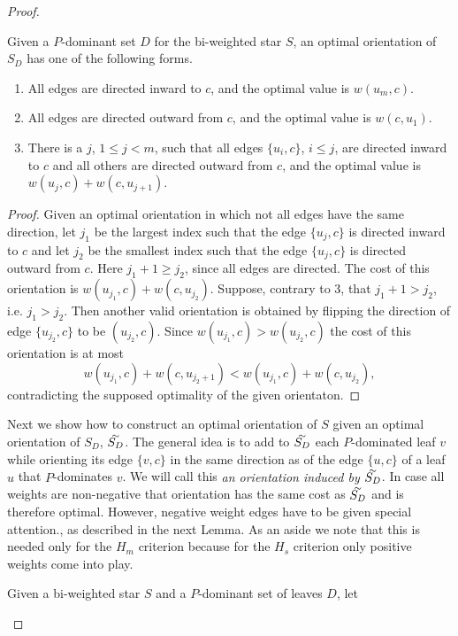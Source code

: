 \begin{proof}
\begin{lemma}\label{l.optimalS_D}
Given a $P$-dominant set $D$ for the bi-weighted star $S$, an optimal orientation of $S_D$ has one of the following forms.
\begin{enumerate}
	\item All edges are directed inward to $c$, and the optimal value is $w(u_m,c)$.
	\item All edges are directed outward from $c$, and the optimal value is $w(c,u_1)$.
	\item There is a $j$, $1\leq j<m$, such that all edges $\{u_i,c\}$, $i\leq j$, are directed inward to $c$ and all others are directed outward from $c$,
    and the optimal value is $w(u_j,c)+w(c,u_{j+1})$.
\end{enumerate}
\end{lemma}
\begin{proof}
	Given an optimal orientation in which not all edges have the same direction, 
	let $j_1$ be the largest index such that the edge $\{u_j,c\}$ is directed inward to $c$
	and let $j_2$ be the smallest index such that the edge $\{u_j,c\}$ is directed outward from $c$. Here $j_1+1\geq j_2$, since all edges are directed.
	The cost of this orientation is $w(u_{j_1},c)+w(c,u_{j_2})$.
	Suppose, contrary to 3, that $j_1+1>j_2$, i.e. $j_1>j_2$. 
	Then another valid orientation is obtained
	by flipping the direction of edge $\{u_{j_2},c\}$ to be $(u_{j_2},c)$.
	Since $w(u_{j_1},c)>w(u_{j_2},c)$ the cost of this orientation is
	at most
	$$w(u_{j_1},c)+w(c,u_{j_2+1})<w(u_{j_1},c)+w(c,u_{j_2}),$$
	contradicting the supposed optimality of the given orientaton.
\end{proof}
Next we show how to construct an optimal orientation of $S$ given an optimal
orientation of $S_D$, $\tildeb{S_D}$. The general idea is to 
add to $\tildeb{S_D}$ each $P$-dominated leaf $v$ while orienting its edge  $\{v,c\}$
in the same direction as of the edge  $\{u,c\}$ of a leaf $u$ that $P$-dominates $v$. 
We will call this \emph{an orientation induced by $\tildeb{S_D}$}.
In case all weights are non-negative
that orientation has the same cost as $\tildeb{S_D}$ and is therefore optimal. 
However, negative weight edges have to be given special
attention., as described in the next Lemma. As an aside we note that 
this is needed only for the $H_m$ criterion because for the $H_s$ criterion
only positive weights come into play.
\begin{lemma}\label{l.optimalSfromS_D}
Given a bi-weighted star $S$ and a $P$-dominant set of leaves $D$, let 

\end{lemma}
\end{proof}
